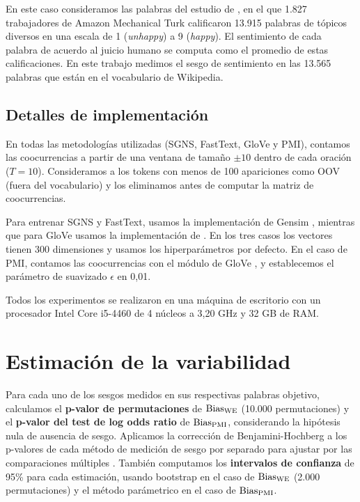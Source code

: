 \begin{description}[leftmargin=\parindent,labelindent=\parindent]
    En este caso consideramos las palabras del estudio de \citet{warriner2013norms}, en el que 1.827 trabajadores de Amazon Mechanical Turk calificaron 13.915 palabras de tópicos diversos en una escala de 1 (\emph{unhappy}) a 9 (\emph{happy}). El sentimiento de cada palabra de acuerdo al juicio humano se computa como el promedio de estas calificaciones. En este trabajo medimos el sesgo de sentimiento en las 13.565 palabras que están en el vocabulario de Wikipedia.

\end{description}


\subsection{Detalles de implementación}


En todas las metodologías utilizadas (SGNS, FastText, GloVe y PMI), contamos las coocurrencias a partir de una ventana de tamaño $\pm 10$ dentro de cada oración ($T=10$). Consideramos a los tokens con menos de 100 apariciones como OOV (fuera del vocabulario) y los eliminamos antes de computar la matriz de coocurrencias.

Para entrenar SGNS y FastText, usamos la implementación de Gensim \citep{rehurek2010gensim}, mientras que para GloVe usamos la implementación de \citet{pennington2014glove}. En los tres casos los vectores tienen 300 dimensiones y usamos los hiperparámetros por defecto. En el caso de PMI, contamos las coocurrencias con el módulo de GloVe \citep{pennington2014glove}, y establecemos el parámetro de suavizado $\epsilon$ en 0,01.

Todos los experimentos se realizaron en una máquina de escritorio con un procesador Intel Core i5-4460 de 4 núcleos a 3,20 GHz y 32 GB de RAM. 


\section{Estimación de la variabilidad} \label{sec:experimento_variabilidad}

Para cada uno de los sesgos medidos en sus respectivas palabras objetivo, calculamos el \textbf{p-valor de permutaciones} de $\operatorname{Bias_{WE}}$ (10.000 permutaciones) y el \textbf{p-valor del test de log odds ratio} de $\operatorname{Bias_{PMI}}$, considerando la hipótesis nula de ausencia de sesgo. Aplicamos la corrección de Benjamini-Hochberg a los p-valores de cada método de medición de sesgo por separado para ajustar por las comparaciones múltiples \citep{benjamini1995correction}. También computamos los \textbf{intervalos de confianza} de 95\% para cada estimación, usando bootstrap en el caso de $\operatorname{Bias_{WE}}$ (2.000 permutaciones) y el método parámetrico en el caso de $\operatorname{Bias_{PMI}}$.

